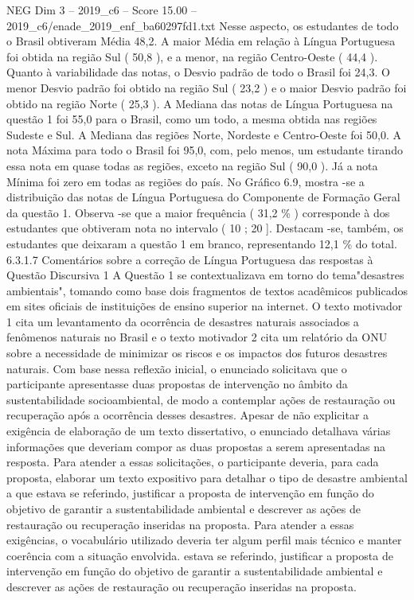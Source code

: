 \begin{textsample}{NEG Dim 3 – 2019\_c6 – Score 15.00 – 2019\_c6/enade\_2019\_enf\_ba60297fd1.txt}
Nesse aspecto, os estudantes de todo o Brasil obtiveram Média 48,2.
A maior Média em relação à Língua Portuguesa foi obtida na região Sul ( 50,8 ), e a menor, na região Centro-Oeste ( 44,4 ).
Quanto à variabilidade das notas, o Desvio padrão de todo o Brasil foi 24,3.
O menor Desvio padrão foi obtido na região Sul ( 23,2 ) e o maior Desvio padrão foi obtido na região Norte ( 25,3 ).
A Mediana das notas de Língua Portuguesa na questão 1 foi 55,0 para o Brasil, como um todo, a mesma obtida nas regiões Sudeste e Sul.
A Mediana das regiões Norte, Nordeste e Centro-Oeste foi 50,0.
A nota Máxima para todo o Brasil foi 95,0, com, pelo menos, um estudante tirando essa nota em quase todas as regiões, exceto na região Sul ( 90,0 ).
Já a nota Mínima foi zero em todas as regiões do país.
No Gráfico 6.9, mostra -se a distribuição das notas de Língua Portuguesa do Componente de Formação Geral da questão 1.
Observa -se que a maior frequência ( 31,2 \% ) corresponde à dos estudantes que obtiveram nota no intervalo ( 10 ; 20 ].
Destacam -se, também, os estudantes que deixaram a questão 1 em branco, representando 12,1 \% do total. 6.3.1.7 Comentários sobre a correção de Língua Portuguesa das respostas à Questão Discursiva 1 A Questão 1 se contextualizava em torno do tema"desastres ambientais", tomando como base dois fragmentos de textos acadêmicos publicados em sites oficiais de instituições de ensino superior na internet.
O texto motivador 1 cita um levantamento da ocorrência de desastres naturais associados a fenômenos naturais no Brasil e o texto motivador 2 cita um relatório da ONU sobre a necessidade de minimizar os riscos e os impactos dos futuros desastres naturais.
Com base nessa reflexão inicial, o enunciado solicitava que o participante apresentasse duas propostas de intervenção no âmbito da sustentabilidade socioambiental, de modo a contemplar ações de restauração ou recuperação após a ocorrência desses desastres.
Apesar de não explicitar a exigência de elaboração de um texto dissertativo, o enunciado detalhava várias informações que deveriam compor as duas propostas a serem apresentadas na resposta.
Para atender a essas solicitações, o participante deveria, para cada proposta, elaborar um texto expositivo para detalhar o tipo de desastre ambiental a que estava se referindo, justificar a proposta de intervenção em função do objetivo de garantir a sustentabilidade ambiental e descrever as ações de restauração ou recuperação inseridas na proposta.
Para atender a essas exigências, o vocabulário utilizado deveria ter algum perfil mais técnico e manter coerência com a situação envolvida. estava se referindo, justificar a proposta de intervenção em função do objetivo de garantir a sustentabilidade ambiental e descrever as ações de restauração ou recuperação inseridas na proposta.

\end{textsample}
